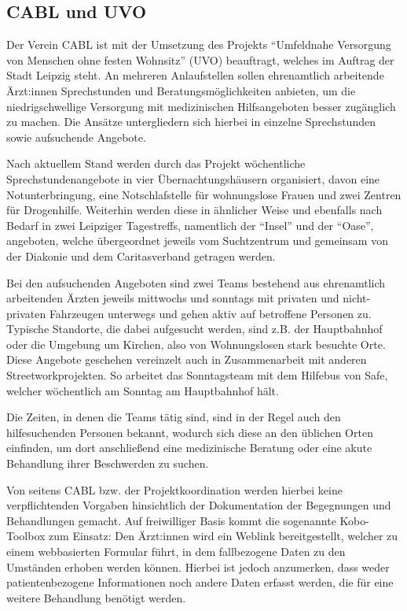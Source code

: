 \subsection{CABL und UVO}

Der Verein \ac{CABL} ist mit der Umsetzung des Projekts \enquote{Umfeldnahe Versorgung von Menschen ohne festen Wohnsitz} (\acs{UVO}) beauftragt, welches im Auftrag der Stadt Leipzig steht. An mehreren Anlaufstellen sollen ehrenamtlich arbeitende Ärzt:innen Sprechstunden und Beratungsmöglichkeiten anbieten, um die niedrigschwellige Versorgung mit medizinischen Hilfsangeboten besser zugänglich zu machen. Die Ansätze untergliedern sich hierbei in einzelne Sprechstunden sowie aufsuchende Angebote.

Nach aktuellem Stand werden durch das Projekt wöchentliche Sprechstundenangebote in vier Übernachtungshäusern organisiert, davon eine Notunterbringung, eine Notschlafstelle für wohnungslose Frauen und zwei Zentren für Drogenhilfe. Weiterhin werden diese in ähnlicher Weise und ebenfalls nach Bedarf in zwei Leipziger Tagestreffs, namentlich der \enquote{Insel} und der \enquote{Oase}, angeboten, welche übergeordnet jeweils vom Suchtzentrum und gemeinsam von der Diakonie und dem Caritasverband getragen werden.

Bei den aufsuchenden Angeboten sind zwei Teams bestehend aus ehrenamtlich arbeitenden Ärzten jeweils mittwochs und sonntags mit privaten und nicht-privaten Fahrzeugen unterwegs und gehen aktiv auf betroffene Personen zu. Typische Standorte, die dabei aufgesucht werden, sind z.B. der Hauptbahnhof oder die Umgebung um Kirchen, also von Wohnungslosen stark besuchte Orte. Diese Angebote geschehen vereinzelt auch in Zusammenarbeit mit anderen Streetworkprojekten. So arbeitet das Sonntagsteam mit dem Hilfebus von \acs{Safe}, welcher wöchentlich am Sonntag am Hauptbahnhof hält.

Die Zeiten, in denen die Teams tätig sind, sind in der Regel auch den hilfesuchenden Personen bekannt, wodurch sich diese an den üblichen Orten einfinden, um dort anschließend eine medizinische Beratung oder eine akute Behandlung ihrer Beschwerden zu suchen.

Von seitens \ac{CABL} bzw. der Projektkoordination werden hierbei keine verpflichtenden Vorgaben hinsichtlich der Dokumentation der Begegnungen und Behandlungen gemacht. Auf freiwilliger Basis kommt die sogenannte Kobo-Toolbox zum Einsatz: Den Ärzt:innen wird ein Weblink bereitgestellt, welcher zu einem webbasierten Formular führt, in dem fallbezogene Daten zu den Umständen erhoben werden können. Hierbei ist jedoch anzumerken, dass weder patientenbezogene Informationen noch andere Daten erfasst werden, die für eine weitere Behandlung benötigt werden.

